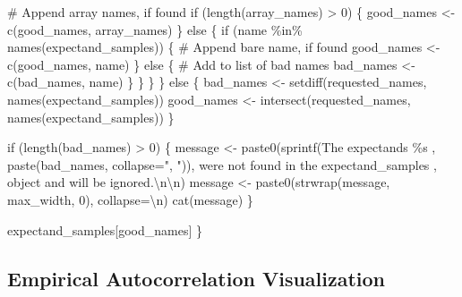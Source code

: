 \documentclass[
  letterpaper,
  DIV=11,
  numbers=noendperiod]{scrartcl}
\newenvironment{Shaded}{\begin{snugshade}}{\end{snugshade}}
\newcommand{\CharTok}[1]{\textcolor[rgb]{0.13,0.47,0.30}{#1}}
\newcommand{\CommentTok}[1]{\textcolor[rgb]{0.37,0.37,0.37}{#1}}
\newcommand{\ControlFlowTok}[1]{\textcolor[rgb]{0.00,0.23,0.31}{#1}}
\newcommand{\DecValTok}[1]{\textcolor[rgb]{0.68,0.00,0.00}{#1}}
\newcommand{\KeywordTok}[1]{\textcolor[rgb]{0.00,0.23,0.31}{#1}}
\newcommand{\NormalTok}[1]{\textcolor[rgb]{0.00,0.23,0.31}{#1}}
\newcommand{\OperatorTok}[1]{\textcolor[rgb]{0.37,0.37,0.37}{#1}}
\newcommand{\SpecialCharTok}[1]{\textcolor[rgb]{0.37,0.37,0.37}{#1}}
\newcommand{\StringTok}[1]{\textcolor[rgb]{0.13,0.47,0.30}{#1}}
\begin{document}
\begin{Shaded}
\begin{Highlighting}[]
      \CommentTok{\# Append array names, if found}
      \ControlFlowTok{if}\NormalTok{ (length(array\_names) }\OperatorTok{\textgreater{}} \DecValTok{0}\NormalTok{) \{}
\NormalTok{        good\_names }\OperatorTok{\textless{}{-}}\NormalTok{ c(good\_names, array\_names)}
\NormalTok{      \} }\ControlFlowTok{else}\NormalTok{ \{}
        \ControlFlowTok{if}\NormalTok{ (name }\OperatorTok{\%}\KeywordTok{in}\OperatorTok{\%}\NormalTok{ names(expectand\_samples)) \{}
          \CommentTok{\# Append bare name, if found}
\NormalTok{          good\_names }\OperatorTok{\textless{}{-}}\NormalTok{ c(good\_names, name)}
\NormalTok{        \}  }\ControlFlowTok{else}\NormalTok{ \{}
          \CommentTok{\# Add to list of bad names}
\NormalTok{          bad\_names }\OperatorTok{\textless{}{-}}\NormalTok{ c(bad\_names, name)}
\NormalTok{        \}}
\NormalTok{      \}}
\NormalTok{    \}}
\NormalTok{  \} }\ControlFlowTok{else}\NormalTok{ \{}
\NormalTok{    bad\_names }\OperatorTok{\textless{}{-}}\NormalTok{ setdiff(requested\_names, names(expectand\_samples))}
\NormalTok{    good\_names }\OperatorTok{\textless{}{-}}\NormalTok{ intersect(requested\_names, names(expectand\_samples))}
\NormalTok{  \}}
    
  \ControlFlowTok{if}\NormalTok{ (length(bad\_names) }\OperatorTok{\textgreater{}} \DecValTok{0}\NormalTok{) \{}
\NormalTok{    message }\OperatorTok{\textless{}{-}}\NormalTok{ paste0(sprintf(}\StringTok{\textquotesingle{}The expectands }\SpecialCharTok{\%s}\StringTok{ \textquotesingle{}}\NormalTok{, }
\NormalTok{                              paste(bad\_names, collapse}\OperatorTok{=}\StringTok{", "}\NormalTok{)),}
                      \StringTok{\textquotesingle{}were not found in the \textasciigrave{}expectand\_samples\textasciigrave{} \textquotesingle{}}\NormalTok{,}
                      \StringTok{\textquotesingle{}object and will be ignored.}\CharTok{\textbackslash{}n\textbackslash{}n}\StringTok{\textquotesingle{}}\NormalTok{)}
\NormalTok{    message }\OperatorTok{\textless{}{-}}\NormalTok{ paste0(strwrap(message, max\_width, }\DecValTok{0}\NormalTok{), collapse}\OperatorTok{=}\StringTok{\textquotesingle{}}\CharTok{\textbackslash{}n}\StringTok{\textquotesingle{}}\NormalTok{)}
\NormalTok{    cat(message)}
\NormalTok{  \}}
  
\NormalTok{  expectand\_samples[good\_names]}
\NormalTok{\}}
\end{Highlighting}
\end{Shaded}

\hypertarget{empirical-autocorrelation-visualization}{%
\subsection{Empirical Autocorrelation
Visualization}\label{empirical-autocorrelation-visualization}}
\end{document}
